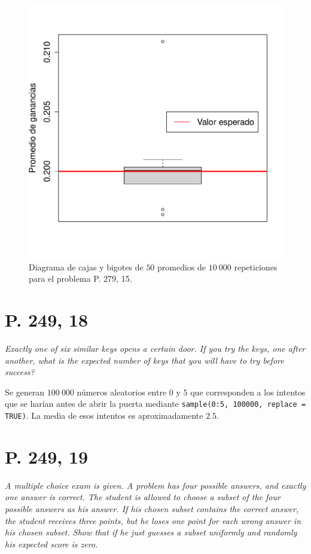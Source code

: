 \documentclass[paper=leter, fontsize=11pt]{scrartcl}
\begin{document}
\begin{figure}
    \centering
    \includegraphics[width=1\textwidth]{249_15.pdf}
    \caption{Diagrama de cajas y bigotes de $50$ promedios de $10\ 000$ repeticiones para el problema P. 279, 15.}
    \label{fig:249_15}
\end{figure}

\section*{P. 249, 18}
\emph{Exactly one of six similar keys opens a certain door. If you try the keys, one after another, what is the expected number of keys that you will have to try before success?}

Se generan $100\ 000$ números aleatorios entre $0$ y $5$ que corresponden a los intentos que se harían antes de abrir la puerta mediante \texttt{sample(0:5, 100000, replace = TRUE)}. La media de esos intentos es aproximadamente $2.5$.

\section*{P. 249, 19}
\emph{A multiple choice exam is given. A problem has four possible answers, and exactly one answer is correct. The student is allowed to choose a subset of the four possible answers as his answer. If his chosen subset contains the correct answer, the student receives three points, but he loses one point for each wrong answer in his chosen subset. Show that if he just guesses a subset uniformly and randomly his expected score is zero.}
\end{document}
